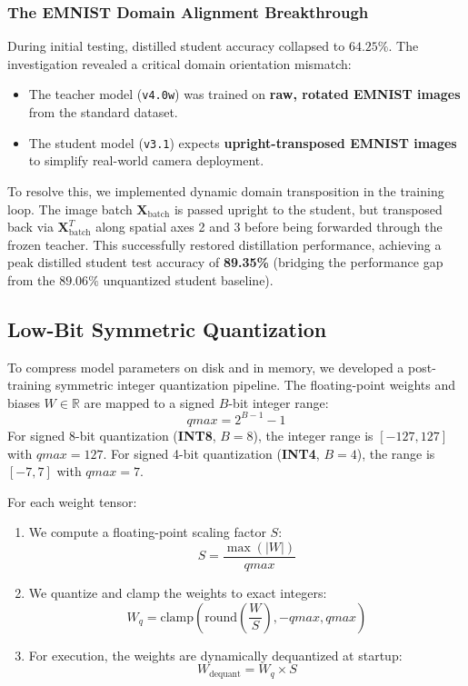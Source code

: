 \documentclass[12pt,a4paper]{article}
\begin{document}
\subsubsection{The EMNIST Domain Alignment Breakthrough}
During initial testing, distilled student accuracy collapsed to $64.25\%$. The investigation revealed a critical domain orientation mismatch:
\begin{itemize}
    \item The teacher model (\texttt{v4.0w}) was trained on \textbf{raw, rotated EMNIST images} from the standard dataset.
    \item The student model (\texttt{v3.1}) expects \textbf{upright-transposed EMNIST images} to simplify real-world camera deployment.
\end{itemize}
To resolve this, we implemented dynamic domain transposition in the training loop. The image batch $\mathbf{X}_{\text{batch}}$ is passed upright to the student, but transposed back via $\mathbf{X}_{\text{batch}}^{T}$ along spatial axes 2 and 3 before being forwarded through the frozen teacher. This successfully restored distillation performance, achieving a peak distilled student test accuracy of \textbf{89.35\%} (bridging the performance gap from the $89.06\%$ unquantized student baseline).

\subsection{Low-Bit Symmetric Quantization}
To compress model parameters on disk and in memory, we developed a post-training symmetric integer quantization pipeline. The floating-point weights and biases $W \in \mathbb{R}$ are mapped to a signed $B$-bit integer range:
\begin{equation}
    qmax = 2^{B-1} - 1
\end{equation}
For signed 8-bit quantization (\textbf{INT8}, $B=8$), the integer range is $[-127, 127]$ with $qmax = 127$. For signed 4-bit quantization (\textbf{INT4}, $B=4$), the range is $[-7, 7]$ with $qmax = 7$.

For each weight tensor:
\begin{enumerate}
    \item We compute a floating-point scaling factor $S$:
          \begin{equation}
              S = \frac{\max(|W|)}{qmax}
          \end{equation}
    \item We quantize and clamp the weights to exact integers:
          \begin{equation}
              W_q = \text{clamp}\left(\text{round}\left(\frac{W}{S}\right), -qmax, qmax\right)
          \end{equation}
    \item For execution, the weights are dynamically dequantized at startup:
          \begin{equation}
              W_{\text{dequant}} = W_q \times S
          \end{equation}
\end{enumerate}
\end{document}
